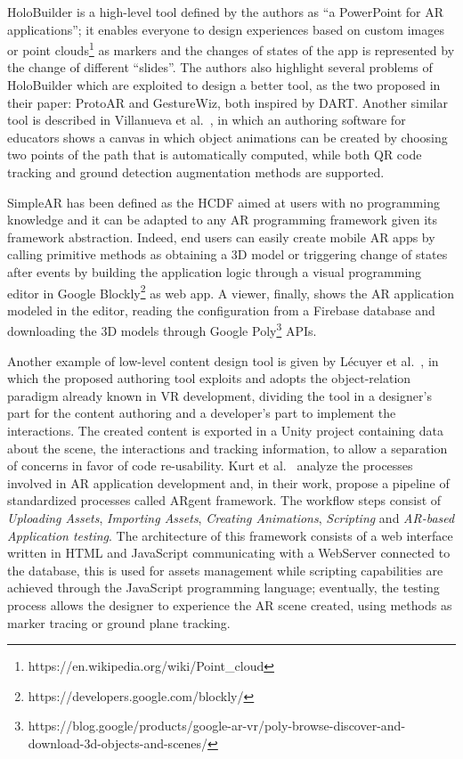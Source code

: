 HoloBuilder \cite{nebeling_trouble_2018} is a high-level tool defined by the authors as “a PowerPoint for AR applications”; it enables everyone to design experiences based on custom images or point clouds\footnote{https://en.wikipedia.org/wiki/Point\_cloud} as markers and the changes of states of the app is represented by the change of different “slides”. The authors also highlight several problems of HoloBuilder which are exploited to design a better tool, as the two proposed in their paper: ProtoAR and GestureWiz, both inspired by DART. Another similar tool is described in Villanueva et al.~\cite{villanueva_meta-ar-app_2020}, in which an authoring software for educators shows a canvas in which object animations can be created by choosing two points of the path that is automatically computed, while both QR code tracking and ground detection augmentation methods are supported.

SimpleAR has been defined as the \gls{HCDF} aimed at users with no programming knowledge \cite{apaza-yllachura_simplear_2019} and it can be adapted to any AR programming framework given its framework abstraction. Indeed, end users can easily create mobile AR apps by calling primitive methods as obtaining a 3D model or triggering change of states after events by building the application logic through a visual programming editor in Google Blockly\footnote{https://developers.google.com/blockly/} as web app. A viewer, finally, shows the AR application modeled in the editor, reading the configuration from a Firebase database and downloading the 3D models through Google Poly\footnote{https://blog.google/products/google-ar-vr/poly-browse-discover-and-download-3d-objects-and-scenes/} APIs.

Another example of low-level content design tool is given by Lécuyer et al.~\cite{lecuyer_authoring_2019}, in which the proposed authoring tool exploits and adopts the object-relation paradigm already known in VR development, dividing the tool in a designer's part for the content authoring and a developer's part to implement the interactions. The created content is exported in a Unity project containing data about the scene, the interactions and tracking information, to allow a separation of concerns in favor of code re-usability.
Kurt et al.~\cite{kurt_argent_2020} analyze the processes involved in AR application development and, in their work, propose a pipeline of standardized processes called ARgent framework. The workflow steps consist of \textit{Uploading Assets}, \textit{Importing Assets}, \textit{Creating Animations}, \textit{Scripting} and \textit{AR-based Application testing}. The architecture of  this framework consists of a web interface written in HTML and JavaScript communicating with a WebServer connected to the database, this is used for assets management while scripting capabilities are achieved through the JavaScript programming language; eventually, the testing process allows the designer to experience the AR scene created, using methods as marker tracing or ground plane tracking.

